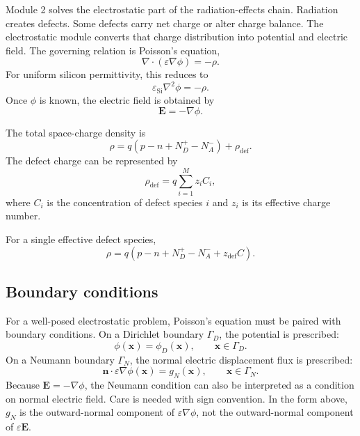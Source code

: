 \documentclass[11pt]{article}
\newcommand{\xv}{\bm{x}}
\newcommand{\Evec}{\mathbf{E}}
\newcommand{\nvecb}{\mathbf{n}}
\newcommand{\rhodef}{\rho_{\mathrm{def}}}
\begin{document}
Module 2 solves the electrostatic part of the radiation-effects chain. Radiation creates defects. Some defects carry net charge or alter charge balance. The electrostatic module converts that charge distribution into potential and electric field. The governing relation is Poisson's equation,
\begin{equation}
\nabla\cdot\left(\varepsilon \nabla \phi\right) = -\rho.
\label{eq:poisson_general}
\end{equation}
For uniform silicon permittivity, this reduces to
\begin{equation}
\varepsilon_{\mathrm{Si}}\nabla^2 \phi = -\rho.
\label{eq:poisson_uniform}
\end{equation}
Once $\phi$ is known, the electric field is obtained by
\begin{equation}
\Evec = -\nabla \phi.
\label{eq:e_field}
\end{equation}

The total space-charge density is
\begin{equation}
\rho = q(p-n+N_D^+-N_A^-) + \rhodef.
\label{eq:total_charge}
\end{equation}
The defect charge can be represented by
\begin{equation}
\rhodef = q\sum_{i=1}^{M} z_i C_i,
\label{eq:defect_charge}
\end{equation}
where $C_i$ is the concentration of defect species $i$ and $z_i$ is its effective charge number.

For a single effective defect species,
\begin{equation}
\rho = q\left(p-n+N_D^+-N_A^-+z_{\mathrm{def}}C\right).
\label{eq:single_species_charge}
\end{equation}

\subsection{Boundary conditions}

For a well-posed electrostatic problem, Poisson's equation must be paired with boundary conditions. On a Dirichlet boundary $\Gamma_D$, the potential is prescribed:
\begin{equation}
\phi(\xv)=\phi_D(\xv),\qquad \xv\in\Gamma_D.
\label{eq:dirichlet_bc}
\end{equation}
On a Neumann boundary $\Gamma_N$, the normal electric displacement flux is prescribed:
\begin{equation}
\nvecb\cdot \varepsilon\nabla\phi(\xv)=g_N(\xv),\qquad \xv\in\Gamma_N.
\label{eq:neumann_bc}
\end{equation}
Because $\Evec=-\nabla\phi$, the Neumann condition can also be interpreted as a condition on normal electric field. Care is needed with sign convention. In the form above, $g_N$ is the outward-normal component of $\varepsilon\nabla\phi$, not the outward-normal component of $\varepsilon\Evec$.
\end{document}
